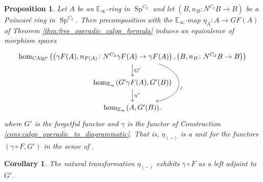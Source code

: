 \documentclass{article}
\DeclareMathOperator{\CAlgp}{CAlg^p} %
\DeclareMathOperator{\Spectra}{Sp} %
\newcommand{\EE}{\mathbb{E}}
\newtheorem{proposition}[equation]{Proposition}
\newtheorem{corollary}[equation]{Corollary}
\theoremstyle{definition}
\begin{document}
\begin{proposition}\label{prop:unit_in_diagrammatic_calgp}
    Let $ A $ be an $ \EE_\infty $-ring in $ \Spectra^{C_2} $ and let $ (B, n_B \colon N^{C_2}B \to B) $ be a Poincaré ring in $ \Spectra^{C_2} $. 
    Then precomposition with the $ \EE_\infty $-map $ \eta_A : A \to GF(A) $ of Theorem \ref{thm:free_operadic_calgp_formula} induces an equivalence of morphism spaces
    \begin{equation}\label{eq:unit_in_normedalg}
    \begin{tikzcd}
        {\hom_{\CAlgp}\left(\left(\gamma F(A), n_{F(A)} \colon N^{C_2}\gamma F(A) \to \gamma F(A)\right),\left(B, n_B \colon N^{C_2} B \to B \right)\right)} \ar[d,"{G'}"] \ar[dd, bend left=75,looseness=2,"{\rotatebox{90}{$\sim$}}"] \\
        \hom_{\EE_\infty}(G'\gamma F(A), G'(B)) \ar[d,"{\eta^*}"] \\
         \hom_{\EE_\infty}(A, G'(B)).
    \end{tikzcd}
    \end{equation}
    where $ G' $ is the forgetful functor and $ \gamma $ is the functor of Construction \ref{cons:calgp_operadic_to_diagrammatic}. 
    That is, $ \eta_{(-)} $ is a unit for the functors $ (\gamma \circ F, G') $ in the sense of \cite[Definition 5.2.2.7]{HTT}. 
\end{proposition}
\begin{corollary}\label{cor:free_algebras_agree}
    The natural transformation $ \eta_{(-)} $ exhibits $ \gamma \circ F $ as a left adjoint to $ G' $. 
\end{corollary}
\end{document}
